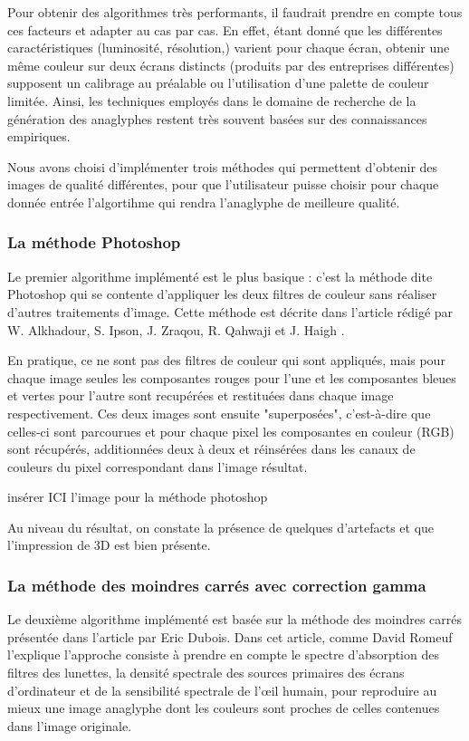 	Pour obtenir des algorithmes très performants, il faudrait prendre en compte tous ces facteurs et adapter au cas par cas. En effet, étant donné que les différentes caractéristiques (luminosité, résolution,) varient pour chaque écran, obtenir une même couleur sur deux écrans distincts (produits par des entreprises différentes) supposent un calibrage au préalable ou l'utilisation d'une palette de couleur limitée. Ainsi, les techniques employés dans le domaine de recherche de la génération des anaglyphes restent très souvent basées sur des connaissances empiriques.
		
	Nous avons choisi d'implémenter trois méthodes qui permettent d'obtenir des images de qualité différentes, pour que l'utilisateur puisse choisir pour chaque donnée entrée l'algortihme qui rendra l'anaglyphe de meilleure qualité. %
	  
\subsubsection{La méthode Photoshop}
	Le premier algorithme implémenté est le plus basique : c'est la méthode dite Photoshop qui se contente d'appliquer les deux filtres de couleur sans réaliser d'autres traitements d'image. Cette méthode est décrite dans l'article rédigé par W. Alkhadour, S. Ipson, J. Zraqou, R. Qahwaji et J. Haigh \cite{steteroAnaglyph}.
		
	En pratique, ce ne sont pas des filtres de couleur qui sont appliqués, mais pour chaque image seules les composantes rouges pour l'une et les composantes bleues et vertes pour l'autre sont recupérées et restituées dans chaque image respectivement. Ces deux images sont ensuite "superposées", c'est-à-dire que celles-ci sont parcourues et pour chaque pixel les composantes en couleur (RGB) sont récupérés, additionnées deux à deux et réinsérées dans les canaux de couleurs du pixel correspondant dans l'image résultat. %
	
	 insérer ICI l'image pour la méthode photoshop

	Au niveau du résultat, on constate la présence de quelques d'artefacts et que l'impression de 3D est bien présente.
\subsubsection{La méthode des moindres carrés avec correction gamma}
	Le deuxième algorithme implémenté est basée sur la méthode des moindres carrés présentée dans l'article \cite{algoDubois} par Eric Dubois. Dans cet article, comme David Romeuf l'explique \cite{explicationAlgoDubois} l'approche consiste à prendre en compte le spectre d'absorption des filtres des lunettes, la densité spectrale des sources primaires des écrans d'ordinateur et de la sensibilité spectrale de l'œil humain, pour reproduire au mieux une image anaglyphe dont les couleurs sont proches de celles contenues dans l'image originale. 
	
